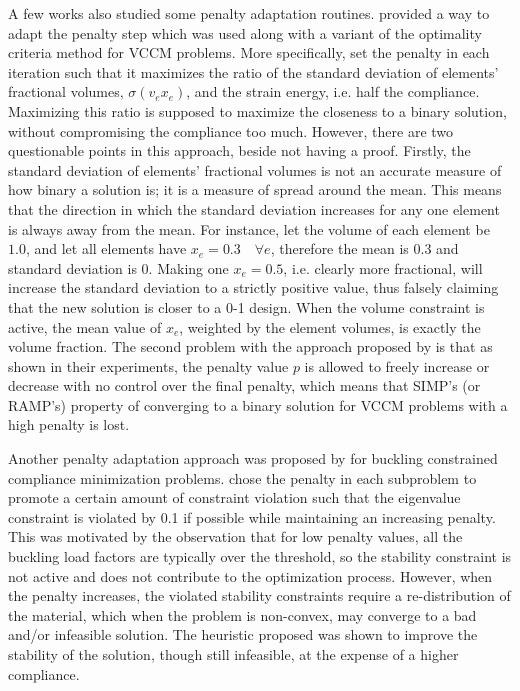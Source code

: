 A few works also studied some penalty adaptation routines. \cite{Dadalau2009} provided a way to adapt the penalty step which was used along with a variant of the optimality criteria method for VCCM problems. More specifically, \cite{Dadalau2009} set the penalty in each iteration such that it maximizes the ratio of the standard deviation of elements' fractional volumes, $\sigma(v_e x_e)$, and the strain energy, i.e. half the compliance. Maximizing this ratio is supposed to maximize the closeness to a binary solution, without compromising the compliance too much. However, there are two questionable points in this approach, beside not having a proof. Firstly, the standard deviation of elements' fractional volumes is not an accurate measure of how binary a solution is; it is a measure of spread around the mean. This means that the direction in which the standard deviation increases for any one element is always away from the mean. For instance, let the volume of each element be $1.0$, and let all elements have $x_e = 0.3 \quad \forall e$, therefore the mean is $0.3$ and standard deviation is $0$. Making one $x_e = 0.5$, i.e. clearly more fractional, will increase the standard deviation to a strictly positive value, thus falsely claiming that the new solution is closer to a 0-1 design. When the volume constraint is active, the mean value of $x_e$, weighted by the element volumes, is exactly the volume fraction. The second problem with the approach proposed by \cite{Dadalau2009} is that as shown in their experiments, the penalty value $p$ is allowed to freely increase or decrease with no control over the final penalty, which means that SIMP's (or RAMP's) property of converging to a binary solution for VCCM problems with a high penalty is lost.

Another penalty adaptation approach was proposed by \cite{GaoXingjun2017} for buckling constrained compliance minimization problems. \cite{GaoXingjun2017} chose the penalty in each subproblem to promote a certain amount of constraint violation such that the eigenvalue constraint is violated by 0.1 if possible while maintaining an increasing penalty. This was motivated by the observation that for low penalty values, all the buckling load factors are typically over the threshold, so the stability constraint is not active and does not contribute to the optimization process. However, when the penalty increases, the violated stability constraints require a re-distribution of the material, which when the problem is non-convex, may converge to a bad and/or infeasible solution. The heuristic proposed was shown to improve the stability of the solution, though still infeasible, at the expense of a higher compliance.

